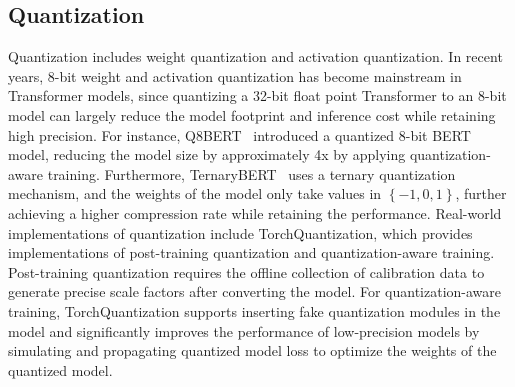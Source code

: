 \subsection{Quantization}\label{subsec:rw:quantization}
Quantization includes weight quantization and activation quantization.
In recent years, 8-bit weight and activation quantization has become mainstream in Transformer models,
since quantizing a 32-bit float point Transformer to an 8-bit model can largely reduce the model footprint
and inference cost while retaining high precision.
For instance, Q8BERT~\cite{zafrir2019q8bert} introduced a quantized 8-bit BERT model,
reducing the model size by approximately 4x by applying quantization-aware training.
Furthermore, TernaryBERT~\cite{zhang2020ternarybert} uses a ternary quantization mechanism,
and the weights of the model only take values in $\left\{ -1,0,1 \right\}$,
further achieving a higher compression rate while retaining the performance.
Real-world implementations of quantization include TorchQuantization,
which provides implementations of post-training quantization and quantization-aware training.
Post-training quantization requires the offline collection of calibration data to generate precise scale factors
after converting the model.
For quantization-aware training, TorchQuantization supports inserting fake quantization modules
in the model and significantly improves the performance of low-precision models by simulating
and propagating quantized model loss to optimize the weights of the quantized model.
